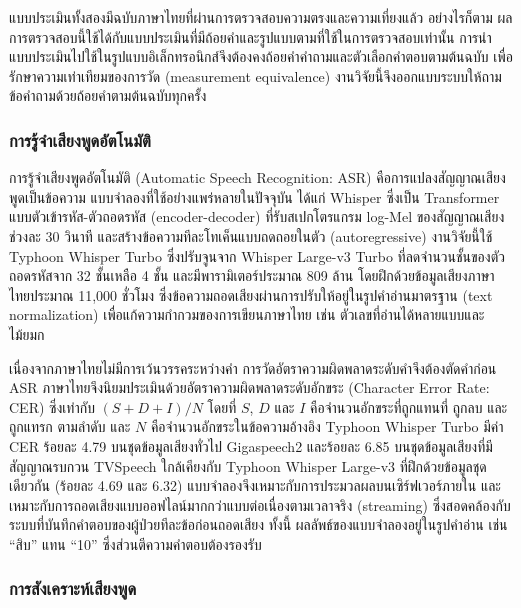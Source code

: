แบบประเมินทั้งสองมีฉบับภาษาไทยที่ผ่านการตรวจสอบความตรงและความเที่ยงแล้ว \citep{Buntragulpoontawee2018, Srisawat2018}
อย่างไรก็ตาม ผลการตรวจสอบนี้ใช้ได้กับแบบประเมินที่มีถ้อยคำและรูปแบบตามที่ใช้ในการตรวจสอบเท่านั้น
การนำแบบประเมินไปใช้ในรูปแบบอิเล็กทรอนิกส์จึงต้องคงถ้อยคำคำถามและตัวเลือกคำตอบตามต้นฉบับ
เพื่อรักษาความเท่าเทียมของการวัด (measurement equivalence) \citep{Coons2009} งานวิจัยนี้จึงออกแบบระบบให้ถามข้อคำถามด้วยถ้อยคำตามต้นฉบับทุกครั้ง

\subsubsection{การรู้จำเสียงพูดอัตโนมัติ}

การรู้จำเสียงพูดอัตโนมัติ (Automatic Speech Recognition: ASR) คือการแปลงสัญญาณเสียงพูดเป็นข้อความ
แบบจำลองที่ใช้อย่างแพร่หลายในปัจจุบัน ได้แก่ Whisper \citep{Radford2023} ซึ่งเป็น Transformer แบบตัวเข้ารหัส-ตัวถอดรหัส (encoder-decoder)
ที่รับสเปกโตรแกรม log-Mel ของสัญญาณเสียงช่วงละ 30 วินาที และสร้างข้อความทีละโทเค็นแบบถดถอยในตัว (autoregressive)
งานวิจัยนี้ใช้ Typhoon Whisper Turbo \citep{TyphoonWhisperTurbo} ซึ่งปรับจูนจาก Whisper Large-v3 Turbo
ที่ลดจำนวนชั้นของตัวถอดรหัสจาก 32 ชั้นเหลือ 4 ชั้น และมีพารามิเตอร์ประมาณ 809 ล้าน \citep{OpenAI2024WhisperTurbo}
โดยฝึกด้วยข้อมูลเสียงภาษาไทยประมาณ 11,000 ชั่วโมง ซึ่งข้อความถอดเสียงผ่านการปรับให้อยู่ในรูปคำอ่านมาตรฐาน (text normalization)
เพื่อแก้ความกำกวมของการเขียนภาษาไทย เช่น ตัวเลขที่อ่านได้หลายแบบและไม้ยมก \citep{Sirichotedumrong2026}

เนื่องจากภาษาไทยไม่มีการเว้นวรรคระหว่างคำ การวัดอัตราความผิดพลาดระดับคำจึงต้องตัดคำก่อน
ASR ภาษาไทยจึงนิยมประเมินด้วยอัตราความผิดพลาดระดับอักขระ (Character Error Rate: CER) ซึ่งเท่ากับ $(S + D + I)/N$
โดยที่ $S$, $D$ และ $I$ คือจำนวนอักขระที่ถูกแทนที่ ถูกลบ และถูกแทรก ตามลำดับ และ $N$ คือจำนวนอักขระในข้อความอ้างอิง \citep{Sirichotedumrong2026}
Typhoon Whisper Turbo มีค่า CER ร้อยละ 4.79 บนชุดข้อมูลเสียงทั่วไป Gigaspeech2 และร้อยละ 6.85 บนชุดข้อมูลเสียงที่มีสัญญาณรบกวน TVSpeech
ใกล้เคียงกับ Typhoon Whisper Large-v3 ที่ฝึกด้วยข้อมูลชุดเดียวกัน (ร้อยละ 4.69 และ 6.32) \citep{Sirichotedumrong2026}
แบบจำลองจึงเหมาะกับการประมวลผลบนเซิร์ฟเวอร์ภายใน และเหมาะกับการถอดเสียงแบบออฟไลน์มากกว่าแบบต่อเนื่องตามเวลาจริง (streaming) \citep{TyphoonWhisperTurbo}
ซึ่งสอดคล้องกับระบบที่บันทึกคำตอบของผู้ป่วยทีละข้อก่อนถอดเสียง
ทั้งนี้ ผลลัพธ์ของแบบจำลองอยู่ในรูปคำอ่าน เช่น ``สิบ'' แทน ``10'' \citep{Sirichotedumrong2026} ซึ่งส่วนตีความคำตอบต้องรองรับ

\subsubsection{การสังเคราะห์เสียงพูด}


